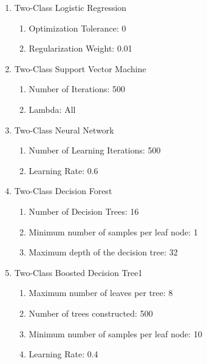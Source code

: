 \begin{enumerate}
    \item{Two-Class Logistic Regression}
    
    \begin{enumerate}
        \item{Optimization Tolerance:} 0
        \item{Regularization Weight:} 0.01
    \end{enumerate}
    
    \item{Two-Class Support Vector Machine}
    
    \begin{enumerate}
        \item{Number of Iterations:} 500
        \item{Lambda:} All
    \end{enumerate}
    
    \item{Two-Class Neural Network}
    
    \begin{enumerate}
        \item{Number of Learning Iterations:} 500
        \item{Learning Rate:} 0.6
    \end{enumerate}
    
    \item{Two-Class Decision Forest}

    \begin{enumerate}
        \item{Number of Decision Trees:} 16
        \item{Minimum number of samples per leaf node:} 1
        \item{Maximum depth of the decision tree:} 32
    \end{enumerate}
    
    \item{Two-Class Boosted Decision Tree}1
    
    \begin{enumerate}
        \item{Maximum number of leaves per tree:} 8
        \item{Number of trees constructed:} 500
        \item{Minimum number of samples per leaf node:} 10
        \item{Learning Rate:} 0.4
    \end{enumerate}
    
\end{enumerate}


